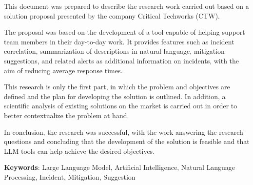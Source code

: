 \begin{abstract}


	O presente documento foi elaborado com o intuito de descrever o trabalho de investigação realizado com base numa proposta de solução apresentada pela empresa \textit{Critical Techworks} (\textit{CTW}).
	
	A proposta consiste em desenvolver uma ferramenta capaz de ajudar os membros de equipas de suporte, no decorrer do seu dia a dia. Através dessa ferramenta, pretende-se fornecer funcionalidades como: correlação de incidentes, sumarização de descrições em linguagem natural, sugestões de mitigação e alertas relacionados como informação adicional aos incidentes e o objetivo de diminuir os tempos médios de resposta.
	
	Este trabalho de investigação, é apenas uma primeira parte onde é definido o problema, os objetivos e é delineado o planeamento para o desenvolvimento da solução. Para além disso, é realizada uma análise cientifica e das soluções que já existem no mercado de forma a contextualizar melhor o problema em questão.
	
	Para concluir, a investigação foi bem sucedida, uma vez que, a questão de investigação foi respondida, concluindo que o desenvolvimento da solução é viável e que as ferramentas de \textit{LLM} podem ajudar a alcançar os objetivos pretendidos.

\end{abstract}

\begin{abstractotherlanguage}

	This document was prepared to describe the research work carried out based on a solution proposal presented by the company Critical Techworks (CTW).
	
	The proposal was based on the development of a tool capable of helping support team members in their day-to-day work. It provides features such as incident correlation, summarization of descriptions in natural language, mitigation suggestions, and related alerts as additional information on incidents, with the aim of reducing average response times.
	
	This research is only the first part, in which the problem and objectives are defined and the plan for developing the solution is outlined. In addition, a scientific analysis of existing solutions on the market is carried out in order to better contextualize the problem at hand.
	
    In conclusion, the research was successful, with the work answering the research questions and concluding that the development of the solution is feasible and that LLM tools can help achieve the desired objectives.
	
	\textbf{Keywords}: Large Language Model, Artificial Intelligence, Natural Language Processing, Incident, Mitigation, Suggestion

\end{abstractotherlanguage}

